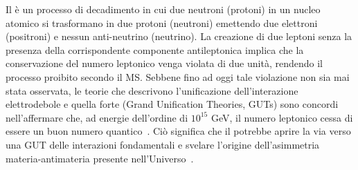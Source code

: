 Il \doppiobeta{} è un processo di decadimento in cui due neutroni (protoni) in un nucleo atomico si trasformano in due protoni (neutroni) emettendo due elettroni (positroni) e nessun anti-neutrino (neutrino).
La creazione di due leptoni senza la presenza della corrispondente componente antileptonica implica che la conservazione del numero leptonico venga violata di due unità, rendendo il processo proibito secondo il MS. 
Sebbene fino ad oggi tale violazione non sia mai stata osservata, le teorie che descrivono l'unificazione dell'interazione elettrodebole e quella forte (Grand Unification Theories, GUTs) sono concordi nell'affermare che, ad energie dell'ordine di $10^{15}$ GeV, il numero leptonico cessa di essere un buon numero quantico~\cite{pirro:epja06}. 
Ciò significa che il \doppiobeta{} potrebbe aprire la via verso una GUT delle interazioni fondamentali e svelare l'origine dell'asimmetria materia-antimateria presente nell'Universo~\cite{vergados:ijmpe16}.

